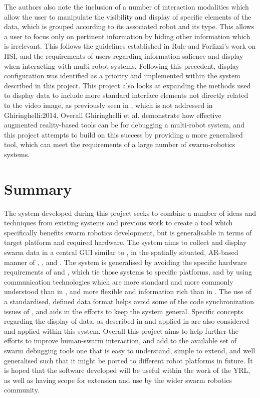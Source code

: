 The authors also note the \cite{Ghiringhelli:2014} inclusion of a number of interaction modalities which allow the user to manipulate the visibility and display of specific elements of the data, which is grouped according to its associated robot and its type. This allows a user to focus only on pertinent information by hiding other information which is irrelevant. This follows the guidelines established in Rule and Forlizzi's work \cite{Rule:2012} on HSI, and the requirements of users regarding information salience and display when interacting with multi robot systems. Following this precedent, display configuration was identified as a priority and implemented within the system described in this project. This project also looks at expanding the methods used to display data to include more standard interface elements not directly related to the video image, as previously seen in \cite{McLurkin:2006}, which is not addressed in {Ghiringhelli:2014}. Overall Ghiringhelli et al. \cite{Ghiringhelli:2014} demonstrate how effective augmented reality-based tools can be for debugging a multi-robot system, and this project attempts to build on this success by providing a more generalised tool, which can meet the requirements of a large number of swarm-robotics systems.

\section{Summary}
The system developed during this project seeks to combine a number of ideas and techniques from existing systems and previous work to create a tool which specifically benefits swarm robotics development, but is generalisable in terms of target platform and required hardware. The system aims to collect and display swarm data in a central GUI similar to \cite{McLurkin:2006}, in the spatially situated, AR-based manner of \cite{Collet:2006}, \cite{Ghiringhelli:2014}, and \cite{Daily:2003}. The system is generalised by avoiding the specific hardware requirements of \cite{McLurkin:2006} and \cite{Collet:2006}, which tie those systems to specific platforms, and by using communication technologies which are more standard and more commonly understood than in \cite{Daily:2003}, and more flexible and information rich than in \cite{Podevijn:2012}. The use of a standardised, defined data format helps avoid some of the code synchronization issues of \cite{McLurkin:2006}, and aids in the efforts to keep the system general. Specific concepts regarding the display of data, as described in \cite{Rule:2012} and applied in \cite{Ghiringhelli:2014} are also considered and applied within this system. Overall this project aims to help further the efforts to improve human-swarm interaction, and add to the available set of swarm debugging tools one that is easy to understand, simple to extend, and well generalised such that it might be ported to different robot platforms in future. It is hoped that the software developed will be useful within the work of the YRL, as well as having scope for extension and use by the wider swarm robotics community.

